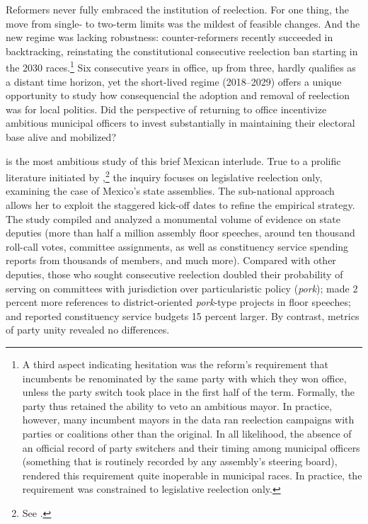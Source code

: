 \documentclass[letter,12pt]{article}
\begin{document}
Reformers never fully embraced the institution of reelection. For one thing, the move from single- to two-term limits was the mildest of feasible changes. And the new regime was lacking robustness: counter-reformers recently succeeded in backtracking, reinstating the constitutional consecutive reelection ban starting in the 2030 races.\footnote{A third aspect indicating hesitation was the reform's requirement that incumbents be renominated by the same party with which they won office, unless the party switch took place in the first half of the term. Formally, the party thus retained the ability to veto an ambitious mayor. In practice, however, many incumbent mayors in the data ran reelection campaigns with parties or coalitions other than the original. In all likelihood, the absence of an official record of party switchers and their timing among municipal officers (something that is routinely recorded by any assembly's steering board), rendered this requirement quite inoperable in municipal races. In practice, the requirement was constrained to legislative reelection only.} Six consecutive years in office, up from three, hardly qualifies as a distant time horizon, yet the short-lived regime (2018--2029) offers a unique opportunity to study how consequencial the adoption and removal of reelection was for local politics. Did the perspective of returning to office incentivize ambitious municipal officers to invest substantially in maintaining their electoral base alive and mobilized?  

\citet{motolinia-reel-book2026} is the most ambitious study of this brief Mexican interlude. True to a prolific literature initiated by \citet{mayhew.1974},\footnote{See \citet{jacobson.1987.runningScared,jacobson.1997,carey.etal.termLim.2000,carey.1996,cox.mccubbins.1993,shepsle.weingast.1994,kerevelPork2015,lucardi.micozzi.Career-argentina.2016,botero.renno-Career-reelec-br-col2007,morgenstern.nacif.2002,jacobson.kernell.1983}.} the inquiry focuses on legislative reelection only, examining the case of Mexico's state assemblies. The sub-national approach allows her to exploit the staggered kick-off dates to refine the empirical strategy. The study compiled and analyzed a monumental volume of evidence on state deputies (more than half a million assembly floor speeches, around ten thousand roll-call votes, committee assignments, as well as constituency service spending reports from thousands of members, and much more). Compared with other deputies, those who sought consecutive reelection doubled their probability of serving on committees with jurisdiction over particularistic policy (\emph{pork}); made 2 percent more references to district-oriented \emph{pork}-type projects in floor speeches; and reported constituency service budgets 15 percent larger. By contrast, metrics of party unity revealed no differences.
\end{document}
